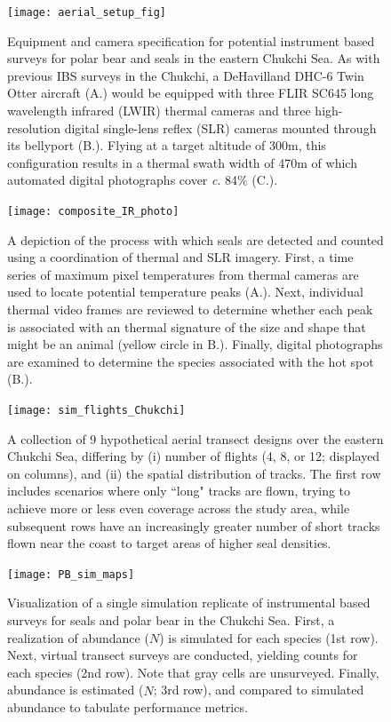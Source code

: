 \documentclass[]{rsos}%
\begin{document}
{\begin{figure}[ht]
\centering
\caption{Equipment and camera specification for potential instrument based surveys for polar bear and seals in the eastern Chukchi Sea.  As with previous IBS surveys in the Chukchi, a DeHavilland DHC-6 Twin Otter aircraft (A.) would be equipped with three FLIR SC645 long wavelength infrared (LWIR) thermal cameras and three high-resolution digital single-lens reflex (SLR) cameras mounted through its bellyport (B.).  Flying at a target altitude of 300m, this configuration results in a thermal swath width of 470m of which automated digital photographs cover \textit{c}. 84\% (C.). }
\texttt{[image: aerial\_setup\_fig]}
\label{fig:platform}
\end{figure}

\begin{figure}[ht]
\centering
\caption{A depiction of the process with which seals are detected and counted using a coordination of thermal and SLR imagery.  First, a time series of maximum pixel temperatures from thermal cameras are used to locate potential temperature peaks (A.). Next, individual thermal video frames are reviewed to determine whether each peak is associated with an thermal signature of the size and shape that might be an animal (yellow circle in B.).  Finally, digital photographs are examined to determine the species associated with the hot spot (B.).}
\texttt{[image: composite\_IR\_photo]}
\label{fig:composite}
\end{figure}

\begin{figure}[ht]
\centering
\caption{A collection of 9 hypothetical aerial transect designs over the eastern Chukchi Sea, differing by (i) number of flights (4, 8, or 12; displayed on columns), and (ii) the spatial distribution of tracks.  The first row includes scenarios where only ``long" tracks are flown, trying to achieve more or less even coverage across the study area, while subsequent rows have an increasingly greater number of short tracks flown near the coast to target areas of higher seal densities.}
\texttt{[image: sim\_flights\_Chukchi]}
\label{fig:flights}
\end{figure}

\begin{figure}[ht]
\centering
\caption{Visualization of a single simulation replicate of instrumental based surveys for seals and polar bear in the Chukchi Sea.  First, a realization of abundance ($N$) is simulated for each species (1st row).  Next, virtual transect surveys are conducted, yielding counts for each species (2nd row).  Note that gray cells are unsurveyed.  Finally, abundance is estimated ($\hat{N}$; 3rd row), and compared to simulated abundance to tabulate performance metrics.}
\texttt{[image: PB\_sim\_maps]}
\label{fig:sim_example}
\end{figure}

}
\end{document}
